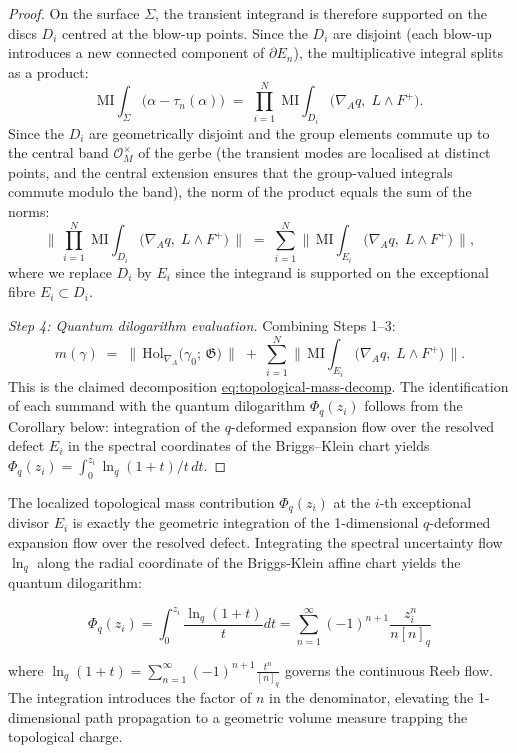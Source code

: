\begin{proof}
On the surface $\Sigma$, the transient integrand is therefore supported
on the discs $D_i$ centred at the blow-up points.  Since the $D_i$ are
disjoint (each blow-up introduces a new connected component of
$\partial E_n$), the multiplicative integral splits as a product:
\[
\mathrm{MI}\!\!\int_\Sigma
  \bigl(\alpha - \tau_n(\alpha)\bigr)
  \;=\;
  \prod_{i=1}^{N}\;
  \mathrm{MI}\!\!\int_{D_i}
  \bigl(\nabla_A q,\; L \wedge F^+\bigr).
\]
Since the $D_i$ are geometrically disjoint and the group elements commute
up to the central band $\mathcal{O}_M^{\times}$ of the gerbe
(the transient modes are localised at distinct points, and the central
extension ensures that the group-valued integrals commute modulo the
band), the norm of the product equals the sum of the norms:
\[
\bigl\lVert\,
  \prod_{i=1}^{N}\;
  \mathrm{MI}\!\!\int_{D_i}
  \bigl(\nabla_A q,\; L \wedge F^+\bigr)
  \,\bigr\rVert
  \;=\;
  \sum_{i=1}^{N}
  \bigl\lVert\,
  \mathrm{MI}\!\!\int_{E_i}
  \bigl(\nabla_A q,\; L \wedge F^+\bigr)
  \,\bigr\rVert,
\]
where we replace $D_i$ by $E_i$ since the integrand is supported on the
exceptional fibre $E_i \subset D_i$.

\emph{Step 4: Quantum dilogarithm evaluation.}
Combining Steps 1--3:
\[
m(\gamma)
  \;=\;
  \bigl\lVert\,
  \mathrm{Hol}_{\nabla_A}\!\bigl(\gamma_0;\, \mathfrak{G}\bigr)
  \,\bigr\rVert
  \;+\;
  \sum_{i=1}^{N}
  \bigl\lVert\,
  \mathrm{MI}\!\!\int_{E_i}
  \bigl(\nabla_A q,\; L \wedge F^+\bigr)
  \,\bigr\rVert.
\]
This is the claimed decomposition \hyperref[eq:topological-mass-decomp]{eq:topological-mass-decomp}.
The identification of each summand with the quantum dilogarithm
$\Phi_q(z_i)$ follows from the Corollary below: integration of the
$q$-deformed expansion flow over the resolved defect $E_i$ in the
spectral coordinates of the Briggs--Klein chart yields
$\Phi_q(z_i) = \int_0^{z_i} \ln_q(1+t)/t\, dt$.
\end{proof}

\begin{corollary}
  \label{cor:quantum-dilogarithm}
The localized topological mass contribution $\Phi_q(z_i)$ at the $i$-th exceptional divisor $E_i$ is exactly the geometric integration of the 1-dimensional $q$-deformed expansion flow over the resolved defect. Integrating the spectral uncertainty flow $\ln_q$ along the radial coordinate of the Briggs-Klein affine chart yields the quantum dilogarithm:

\begin{equation}
\Phi_q(z_i) = \int_0^{z_i} \frac{\ln_q(1+t)}{t} dt = \sum_{n=1}^\infty (-1)^{n+1} \frac{z_i^n}{n [n]_q}
\end{equation}

where $\ln_q(1+t) = \sum_{n=1}^\infty (-1)^{n+1} \frac{t^n}{[n]_q}$ governs the continuous Reeb flow. The integration introduces the factor of $n$ in the denominator, elevating the 1-dimensional path propagation to a geometric volume measure trapping the topological charge.
\end{corollary}

